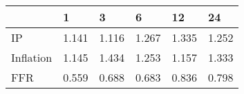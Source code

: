 \begin{tabular}{llllll}
\toprule 
& 1 & 3 & 6 & 12 & 24 \\ 
\midrule 
IP & 1.141 & 1.116 & 1.267 & 1.335 & 1.252 \\ 
Inflation & 1.145 & 1.434 & 1.253 & 1.157 & 1.333 \\ 
FFR & 0.559 & 0.688 & 0.683 & 0.836 & 0.798 \\ 
\bottomrule 
\end{tabular}